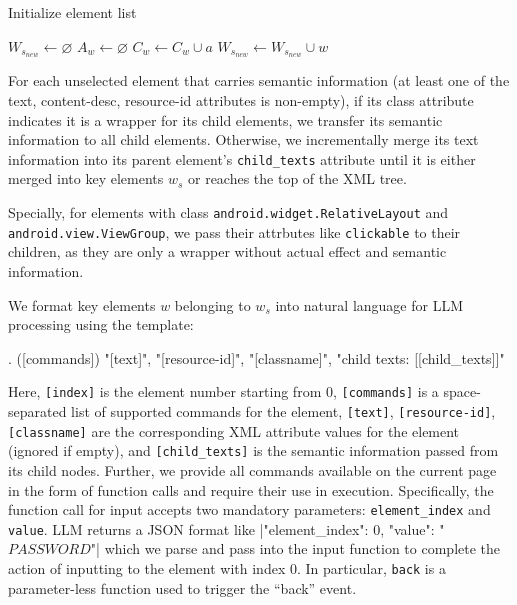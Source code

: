 \documentclass[conference]{IEEEtran}
\begin{document}
\begin{algorithm}
\caption{Initialize element list}
\label{alg_init_element_list}
\begin{algorithmic}

    \State $W_{s_{new}} \gets \varnothing$
        \State $A_{w} \gets \varnothing$
                \State $C_{w} \gets C_{w} \cup a$
            \EndIf
        \EndFor
            \State $W_{s_{new}} \gets W_{s_{new}} \cup w$
        \EndIf
    \EndFor
\end{algorithmic}
\end{algorithm}


For each unselected element that carries semantic information (at least one of the text, content-desc, resource-id attributes is non-empty), if its class attribute indicates it is a wrapper for its child elements, we transfer its semantic information to all child elements. Otherwise, we incrementally merge its text information into its parent element's \texttt{child\_texts} attribute until it is either merged into key elements $w_s$ or reaches the top of the XML tree.

Specially, for elements with class \texttt{android.widget.RelativeLayout} and \texttt{android.view.ViewGroup}, we pass their attrbutes like \texttt{clickable} to their children, as they are only a wrapper without actual effect and semantic information.

We format key elements $w$ belonging to $w_s$ into natural language for LLM processing using the template:

\begin{spverbatim}
[index]. ([commands]) "[text]", "[resource-id]", "[classname]", "child texts: [[child_texts]]"
\end{spverbatim}


Here, \texttt{[index]} is the element number starting from 0, \texttt{[commands]} is a space-separated list of supported commands for the element, \texttt{[text]}, \texttt{[resource-id]}, \texttt{[classname]} are the corresponding XML attribute values for the element (ignored if empty), and \texttt{[child\_texts]} is the semantic information passed from its child nodes. Further, we provide all commands available on the current page in the form of function calls and require their use in execution. Specifically, the function call for input accepts two mandatory parameters: \texttt{element\_index} and \texttt{value}. LLM returns a JSON format like \spverb|{"element_index": 0, "value": "$PASSWORD$"}| which we parse and pass into the input function to complete the action of inputting to the element with index 0. In particular, \texttt{back} is a parameter-less function used to trigger the ``back'' event.
\end{document}
